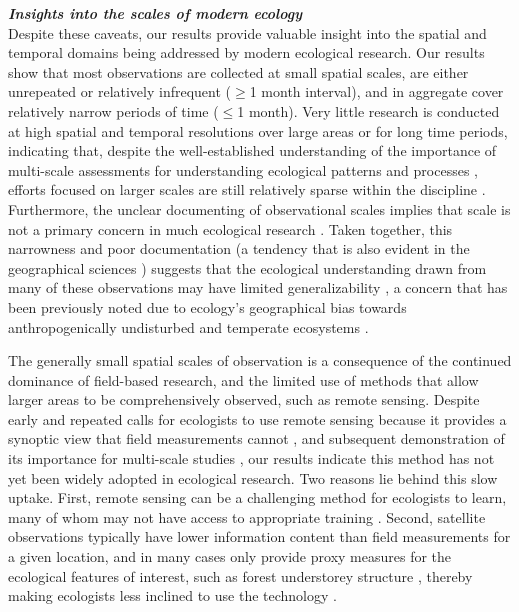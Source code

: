 \documentclass[12pt]{article}
\begin{document}
\noindent \textbf{\emph{Insights into the scales of modern ecology}}\\
Despite these caveats, our results provide valuable insight into the spatial and temporal domains being addressed by modern ecological research. Our results show that most observations are collected at small spatial scales, are either unrepeated or relatively infrequent ($\geq$1 month interval), and in aggregate cover relatively narrow periods of time ($\leq$1 month). Very little research is conducted at high spatial and temporal resolutions over large areas or for long time periods, indicating that, despite the well-established understanding of the importance of multi-scale assessments for understanding ecological patterns and processes \cite{levin_problem_1992,wiens_spatial_1989}, efforts focused on larger scales are still relatively sparse within the discipline \cite{levin_problem_1992,wiens_spatial_1989}. Furthermore, the unclear documenting of observational scales implies that scale is not a primary concern in much ecological research \cite{chave_problem_2013, wheatley_factors_2009}. Taken together, this narrowness and poor documentation (a tendency that is also evident in the geographical sciences \cite{margulies_ambiguous_2016}) suggests that the ecological understanding drawn from many of these observations may have limited generalizability \cite{margulies_ambiguous_2016, wheatley_factors_2009, wiens_spatial_1989}, a concern that has been previously noted due to ecology's geographical bias towards anthropogenically undisturbed and temperate ecosystems \cite{martin_mapping_2012}. 

The generally small spatial scales of observation is a consequence of the continued dominance of field-based research, and the limited use of methods that allow larger areas to be comprehensively observed, such as remote sensing. Despite early and repeated calls for ecologists to use remote sensing because it provides a synoptic view that field measurements cannot \cite{turner_remote_2003, kerr_space_2003, pettorelli_satellite_2014}, and subsequent demonstration of its importance for multi-scale studies \cite{estes_habitat_2008, estes_predictive_2011}, our results indicate this method has not yet been widely adopted in ecological research. Two reasons lie behind this slow uptake. First, remote sensing can be a challenging method for ecologists to learn, many of whom may not have access to appropriate training \cite{pettorelli_satellite_2014}. Second, satellite observations typically have lower information content than field measurements for a given location, and in many cases only provide proxy measures for the ecological features of interest, such as forest understorey structure \cite{estes_remote_2010}, thereby making ecologists less inclined to use the technology \cite{turner_remote_2003}. 
\end{document}
